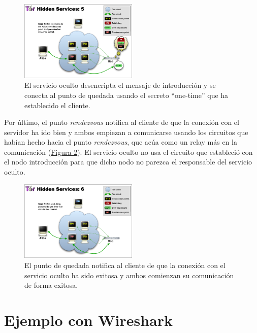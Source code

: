 \documentclass[10pt,a4paper,spanish]{article}
\begin{document}
\begin{figure}[!h]
    \centering
    \includegraphics[width=0.5\textwidth]{THS-5}
    \caption{El servicio oculto desencripta el mensaje de introducción y se conecta al punto de quedada usando el secreto ``one-time'' que ha establecido el cliente.}
    \label{ths5}
\end{figure}

Por último, el punto \textit{rendezvous} notifica al cliente de que la conexión con el servidor ha ido bien y ambos empiezan a comunicarse usando los circuitos que habían hecho hacia el punto \textit{rendezvous}, que acúa como un relay más en la comunicación (\hyperref[ths6]{Figura \ref*{ths6}}). El servicio oculto no usa el circuito que estableció con el nodo introducción para que dicho nodo no parezca el responsable del servicio oculto. 

\begin{figure}[!h]
    \centering
    \includegraphics[width=0.5\textwidth]{THS-6}
    \caption{El punto de quedada notifica al cliente de que la conexión con el servicio oculto ha sido exitosa y ambos comienzan su comunicación de forma exitosa.}
    \label{ths6}
\end{figure}

\section{Ejemplo con Wireshark}

\end{document}

